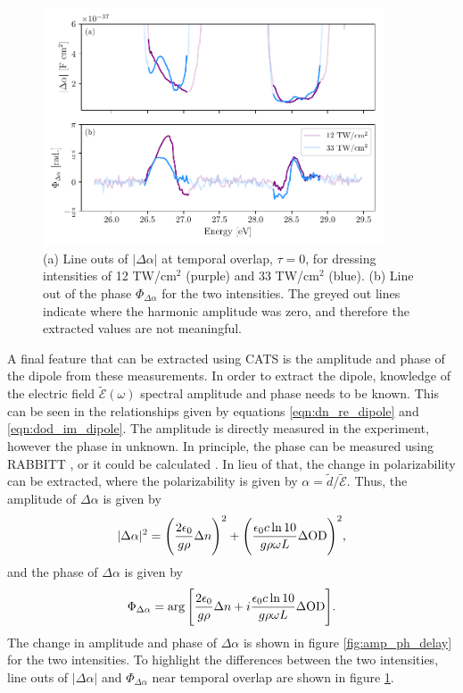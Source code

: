 \begin{figure}
	\centering
	\includegraphics[width=0.9\textwidth]{figures/CATS/amp_ph_lineout.pdf}
	\caption[Line outs of $\lvert\Delta\alpha\rvert$ and $\Phi_{\Delta\alpha}$ at $\tau=0$ using CATS]{(a) Line outs of $\lvert\Delta\alpha\rvert$ at temporal overlap, $\tau=0$, for dressing intensities of 12 TW/cm$^2$ (purple) and 33 TW/cm$^2$ (blue). (b) Line out of the phase $\Phi_{\Delta\alpha}$ for the two intensities.  The greyed out lines indicate where the harmonic amplitude was zero, and therefore the extracted values are not meaningful.}
	\label{fig:amp_ph_lineout}
\end{figure}

A final feature that can be extracted using CATS is the amplitude and phase of the dipole from these measurements.  In order to extract the dipole, knowledge of the electric field $\tilde{\mathcal{E}}(\omega)$ spectral amplitude and phase needs to be known.  This can be seen in the relationships given by equations \ref{eqn:dn_re_dipole} and \ref{eqn:dod_im_dipole}.  The amplitude is directly measured in the experiment, however the phase in unknown.  In principle, the phase can be measured using RABBITT \cite{paulObservationTrainAttosecond2001}, or it could be calculated \cite{lewensteinTheoryHighharmonicGeneration1994}.  In lieu of that, the change in polarizability can be extracted, where the polarizability is given by $\alpha=\tilde{d}/\tilde{\mathcal{E}}$.  Thus, the amplitude of $\Delta\alpha$ is given by
\begin{equation}
	\label{eqn:polariz_amp}
	\lvert\Delta\alpha\rvert^2 = \Bigg(\frac{2\epsilon_0}{g\rho}\Delta n\Bigg)^2 + \Bigg( \frac{\epsilon_0 c \ln 10}{g \rho \omega L}\Delta\mathrm{OD} \Bigg)^2,
\end{equation}
and the phase of $\Delta\alpha$ is given by
\begin{equation}
	\label{eqn:polariz_phase}
	\Phi_{\Delta\alpha}=\arg\Bigg[ \frac{2\epsilon_0}{g\rho}\Delta n  + i \frac{\epsilon_0 c \ln 10}{g \rho \omega L}\Delta\mathrm{OD}\Bigg].
\end{equation}
The change in amplitude and phase of $\Delta\alpha$ is shown in figure \ref{fig:amp_ph_delay} for the two intensities.  To highlight the differences between the two intensities, line outs of $\lvert\Delta\alpha\rvert$ and $\Phi_{\Delta\alpha}$ near temporal overlap are shown in figure \ref{fig:amp_ph_lineout}.  




